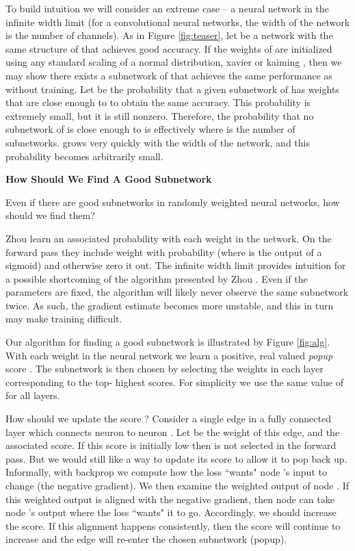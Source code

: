 \documentclass[10pt,twocolumn,letterpaper]{article}
\begin{document}
To build intuition we will consider an extreme case -- a neural network  in the infinite width limit (for a convolutional neural networks, the width of the network is the number of channels). As in Figure \ref{fig:teaser}, let  be a network with the same structure of  that achieves good accuracy. If the weights of  are initialized using any standard scaling of a normal distribution, \eg xavier \cite{glorot} or kaiming \cite{kaiming-init}, then we may show there exists a subnetwork of  that achieves the same performance as  without training. Let  be the probability that a given subnetwork of  has weights that are close enough to  to obtain the same accuracy. This probability  is extremely small, but it is still nonzero. Therefore, the probability that no subnetwork of  is close enough to  is effectively  where  is the number of subnetworks.  grows very quickly with the width of the network, and this probability becomes arbitrarily small.

\noindent \textbf{How Should We Find A Good Subnetwork}


Even if there are good subnetworks in randomly weighted neural networks, how should we find them? 


Zhou \etal learn an associated probability  with each weight  in the network. On the forward pass they include weight  with probability  (where  is the output of a sigmoid) and otherwise zero it out. The infinite width limit provides intuition for a possible shortcoming of the algorithm presented by Zhou \etal \cite{supermask}. Even if the parameters  are fixed, the algorithm will likely never observe the same subnetwork twice. As such, the gradient estimate becomes more unstable, and this in turn may make training difficult.

Our algorithm for finding a good subnetwork is illustrated by Figure \ref{fig:alg}. With each weight  in the neural network we learn a positive, real valued \textit{popup} score . The subnetwork is then chosen by selecting the weights in each layer corresponding to the top- highest scores. For simplicity we use the same value of  for all layers. 

How should we update the score ? Consider a single edge in a fully connected layer which connects neuron  to neuron . Let  be the weight of this edge, and  the associated score. If this score is initially low then  is not selected in the forward pass. But we would still like a way to update its score to allow it to pop back up. Informally, with backprop \cite{backprop} we compute how the loss ``wants" node 's input to change (\ie the negative gradient). We then examine the weighted output of node . If this weighted output is aligned with the negative gradient, then node  can take node 's output where the loss ``wants" it to go. Accordingly, we should increase the score. If this alignment happens consistently, then the score will continue to increase and the edge will re-enter the chosen subnetwork (\ie popup).
\end{document}
